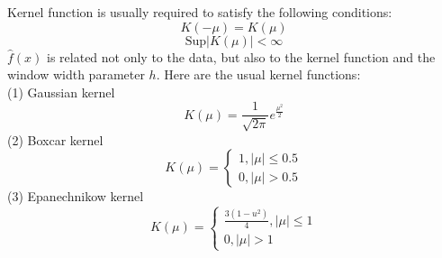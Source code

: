 \documentclass[11pt]{report}
\begin{document}
	\noindent Kernel function is usually required to satisfy the following conditions:
	\begin{equation}
	K\left(-\mu\right) = K\left(\mu\right)
	\end{equation}
	\begin{equation}
	\text{Sup}|K\left(\mu\right)| < \infty
	\end{equation}
	$\hat{f}(x)$ is related not only to the data, but also to the kernel function and the window width parameter $h$. Here are the usual kernel functions:\\
	\noindent (1) Gaussian kernel
	\begin{equation}
	K\left(\mu\right) = \frac{1}{\sqrt{2\pi}}e^{\frac{\mu^2}{2}}
	\end{equation}
	\noindent (2) Boxcar kernel
	\begin{equation}
	K\left(\mu\right) = \left\{ \begin{array}{ll}
	1, |\mu|\leq 0.5\\
	0, |\mu|> 0.5
	\end{array} \right. 
	\end{equation}
	\noindent (3) Epanechnikow kernel
	\begin{equation}
	K\left(\mu\right) = \left\{ \begin{array}{ll}
	\frac{3\left(1-u^2\right)}{4},|\mu| \leq 1\\
	0,|\mu|>1
	\end{array} \right.
	\end{equation}
	
\end{document}
